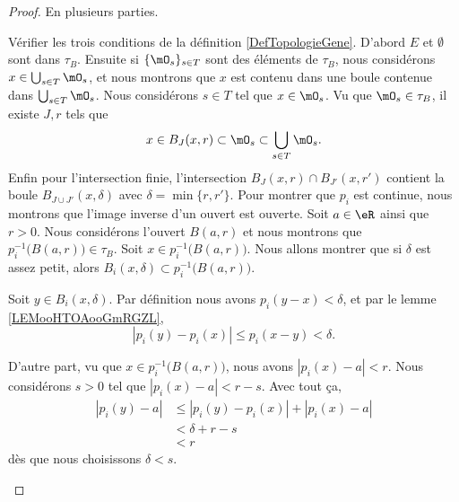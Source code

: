 \begin{proof}
	En plusieurs parties.
	\begin{subproof}
		Vérifier les trois conditions de la définition \ref{DefTopologieGene}. D'abord \( E\) et \( \emptyset\) sont dans \( \tau_B\). Ensuite si \( \{ \mO_s \}_{s\in T}\) sont des éléments de \( \tau_B\), nous considérons \( x\in \bigcup_{s\in T}\mO_s\), et nous montrons que \( x\) est contenu dans une boule contenue dans \( \bigcup_{s\in T}\mO_s\). Nous considérons \( s\in T\) tel que \( x\in \mO_s\). Vu que \( \mO_s\in\tau_B\), il existe \( J,r\) tels que
		\begin{equation}
			x\in B_J(x,r)\subset\mO_s\subset\bigcup_{s\in T}\mO_s.
		\end{equation}
		Enfin pour l'intersection finie, l'intersection \( B_J(x,r)\cap B_{J'}(x,r')\) contient la boule \( B_{J\cup J'}(x,\delta)\) avec \( \delta=\min\{ r,r' \}\).
		Pour montrer que \( p_i\) est continue, nous montrons que l'image inverse d'un ouvert est ouverte. Soit \( a\in \eR\) ainsi que \( r>0\). Nous considérons l'ouvert \( B(a,r)\) et nous montrons que \( p_i^{-1}\big( B(a,r) \big)\in \tau_B\). Soit \( x\in p_i^{-1}\big( B(a,r) \big)\). Nous allons montrer que si \( \delta\) est assez petit, alors \( B_i(x,\delta)\subset p_i^{-1}\big( B(a,r) \big)\).

		Soit \( y\in B_i(x,\delta)\). Par définition nous avons \( p_i(y-x)<\delta\), et par le lemme \ref{LEMooHTOAooGmRGZL},
		\begin{equation}
			| p_i(y)-p_i(x) |\leq p_i(x-y)<\delta.
		\end{equation}

		D'autre part, vu que \( x\in p_i^{-1}\big( B(a,r) \big)\), nous avons \( | p_i(x)-a |<r\). Nous considérons \( s>0\) tel que \( | p_i(x)-a |<r-s\). Avec tout ça,
		\begin{subequations}
			\begin{align}
				| p_i(y)-a | & \leq | p_i(y)-p_i(x) |+| p_i(x)-a | \\
				             & <\delta+r-s                         \\
				             & <r
			\end{align}
		\end{subequations}
		dès que nous choisissons \( \delta<s\).


\end{subproof}
\end{proof}
